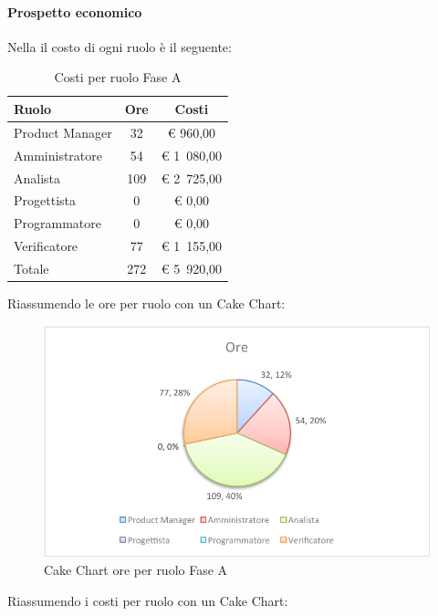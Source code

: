 			\paragraph{Prospetto economico}
				Nella  il costo di ogni ruolo è il seguente:
				\begin{table}[H]
					\begin{center}
						\begin{tabular}{| l | c | c |}
							\hline
							Ruolo 			& Ore 	& Costi  \\ \hline
							
							Product Manager	& 32 		& \euro{} 960,00 	\\
							Amministratore 		& 54 		& \euro{} 1~080,00 	\\
							Analista	 		& 109 	& \euro{} 2~725,00 	\\
							Progettista 		& 0		& \euro{} 0,00 	\\
							Programmatore		& 0		& \euro{} 0,00	\\
							Verificatore		& 77 		& \euro{} 1~155,00 	\\ \hline \hline
							
							Totale	 		& 272 	& \euro{} 5~920,00 	\\ \hline
						\end{tabular}
					\end{center}
					\caption{Costi per ruolo Fase A}
				\end{table}
				Riassumendo le ore per ruolo con un Cake Chart:
				\begin{figure}[H]\centering
					\includegraphics[width=\textwidth]{PianoDiProgetto/Pics/ChartTotOreFaseA.pdf}
					\caption{Cake Chart ore per ruolo Fase A}
				\end{figure}
				Riassumendo i costi per ruolo con un Cake Chart:
